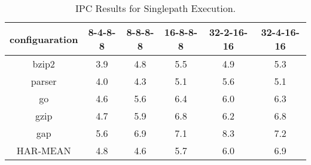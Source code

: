 \begin{table}
\begin{center}
\caption{IPC Results for Singlepath Execution.}
\label{tab:ipc1}
\begin{tabular}{|c|c|c|c|c|c|}
\hline 
configuaration&
8-4-8-8&
8-8-8-8&
16-8-8-8&
32-2-16-16&
32-4-16-16\\
\hline
bzip2&3.9&4.8&5.5&4.9&5.3\\
\hline 
parser&4.0&4.3&5.1&5.6&5.1\\
\hline 
go&4.6&5.6&6.4&6.0&6.3\\
\hline 
gzip&4.7&5.9&6.8&6.2&6.8\\
\hline 
gap&5.6&6.9&7.1&8.3&7.2\\
\hline 
\hline 
HAR-MEAN&
4.8&4.6&5.7&6.0&6.9\\
\hline
\end{tabular}
\end{center}
\end{table}
